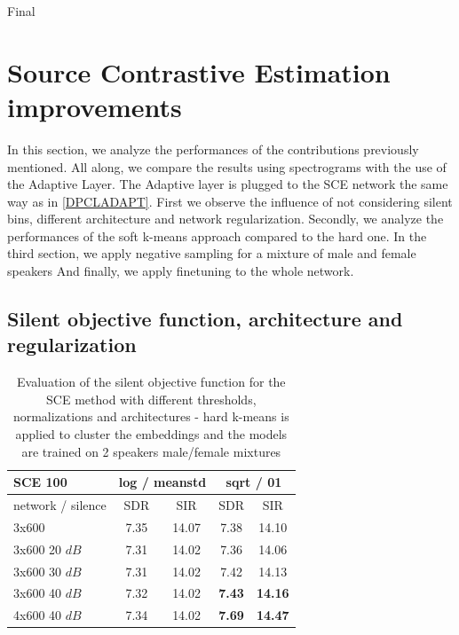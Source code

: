 \documentclass[master, tikz, final,11pt, dvipdfmx]{iscs-thesis}
\begin{document}
Final

\section{Source Contrastive Estimation improvements}

In this section, we analyze the performances of the contributions previously mentioned. All along, we compare the results using spectrograms with the use of the Adaptive Layer. The Adaptive layer is plugged to the SCE network the same way as in \autoref{DPCLADAPT}.
First we observe the influence of not considering silent bins, different architecture and network regularization. Secondly, we analyze the performances of the soft k-means approach compared to the hard one. In the third section, we apply negative sampling for a mixture of male and female speakers
And finally, we apply finetuning to the whole network.

\subsection{Silent objective function, architecture and regularization}
\label{silentloss}

\begin{table}[h]
\centering
\begin{tabular}{l|c|c|c|c}
SCE 100 & \multicolumn{2}{c|}{log / meanstd } & \multicolumn{2}{c}{sqrt / 01} \\ 
\hline 
network / silence & SDR & SIR & SDR & SIR  \\ 
\hline 
3x600 & 7.35 & 14.07 & 7.38 & 14.10 \\ 
\hline 
\hline 
3x600 20 $dB$ & 7.31 & 14.02 & 7.36 & 14.06 \\ 
3x600 30 $dB$ & 7.31 & 14.02 & 7.42 & 14.13 \\ 
3x600 40 $dB$ & 7.32 & 14.02 & \textbf{7.43} & \textbf{14.16} \\ 
\hline 
\hline 

4x600 40 $dB$ & 7.34 & 14.02 & \cellcolor{green}\textbf{7.69} &
 \cellcolor{green}\textbf{14.47} \\ 
\end{tabular}
\caption[Evaluation of the silent objective function for the SCE method with spectrograms]{Evaluation of the silent objective function for the SCE method with different thresholds, normalizations and architectures - hard k-means is applied to cluster the embeddings and the models are trained on 2 speakers male/female mixtures}
\label{table:SCEsilence}
\end{table}
\end{document}
